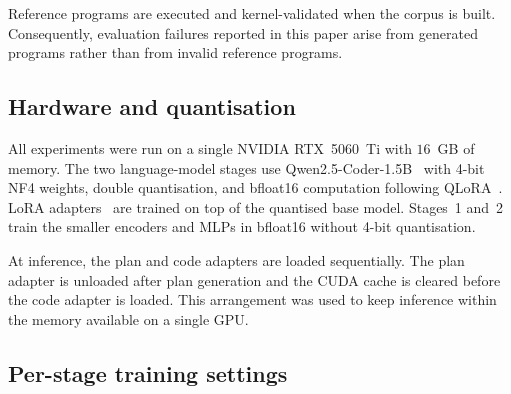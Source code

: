 \documentclass[preprint,12pt]{elsarticle}
\begin{document}
Reference programs are executed and kernel-validated when the corpus is built.
Consequently, evaluation failures reported in this paper arise from generated
programs rather than from invalid reference programs.

\subsection{Hardware and quantisation}
\label{app:hardware}

All experiments were run on a single NVIDIA RTX~5060~Ti with $16$~GB of memory.
The two language-model stages use Qwen2.5-Coder-1.5B~\cite{yang2025qwen25} with
4-bit NF4 weights, double quantisation, and bfloat16 computation following
QLoRA~\cite{dettmers2023qlora}. LoRA adapters~\cite{hu2021lora} are trained on
top of the quantised base model. Stages~1 and~2 train the smaller encoders and
MLPs in bfloat16 without 4-bit quantisation.

At inference, the plan and code adapters are loaded sequentially. The plan
adapter is unloaded after plan generation and the CUDA cache is cleared before
the code adapter is loaded. This arrangement was used to keep inference within
the memory available on a single GPU.

\subsection{Per-stage training settings}
\label{app:stage_settings}
\end{document}
